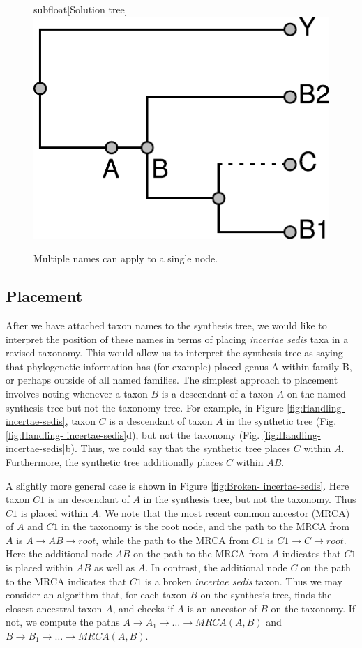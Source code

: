 \documentclass[english]{article}
\begin{document}
\begin{figure}
\hfill{}subfloat[Solution tree]{\includegraphics[scale=0.5]{Figures/names2nodes1/solution2-shaded}}
\hfill{}
\caption{\label{fig:Multiple-names-can}Multiple names can apply to a single node.}
\end{figure}

\emph{}

\subsection{Placement}\label{subsec:Placement}

After we have attached taxon names to the synthesis tree, we would
like to interpret the position of these names in terms of placing
\emph{incertae sedis }taxa in a revised taxonomy. This would allow us
to interpret the synthesis tree as saying that phylogenetic
information has (for example) placed genus A within family B, or
perhaps outside of all named families. The simplest approach to
placement involves noting whenever a taxon $B$ is a descendant of a
taxon $A$ on the named synthesis tree but not the taxonomy tree. For
example, in Figure \ref{fig:Handling-incertae-sedis}, taxon $C$ is a
descendant of taxon $A$ in the synthetic tree (Fig. \ref{fig:Handling-
incertae-sedis}d), but not the taxonomy (Fig. \ref{fig:Handling-
incertae-sedis}b). Thus, we could say that the synthetic tree places
$C$ within $A$. Furthermore, the synthetic tree additionally places
$C$ within $AB$.

A slightly more general case is shown in Figure \ref{fig:Broken-
incertae-sedis}. Here taxon $C1$ is an descendant of $A$ in the
synthesis tree, but not the taxonomy. Thus $C1$ is placed within $A$.
We note that the most recent common ancestor (MRCA) of $A$ and $C1$ in
the taxonomy is the root node, and the path to the MRCA from $A$ is
$A\to AB\to root$, while the path to the MRCA from $C1$ is $C1\to C\to
root$. Here the additional node $AB$ on the path to the MRCA from $A$
indicates that $C1$ is placed within $AB$ as well as $A$. In contrast,
the additional node $C$ on the path to the MRCA indicates that $C1$ is
a broken \emph{incertae sedis} taxon. Thus we may consider an
algorithm that, for each taxon $B$ on the synthesis tree, finds the
closest ancestral taxon $A$, and checks if $A$ is an ancestor of $B$
on the taxonomy. If not, we compute the paths $A\to A_{1}\to\ldots\to
MRCA(A,B)$ and $B\to B_{1}\to\ldots\to MRCA(A,B)$.
\end{document}
